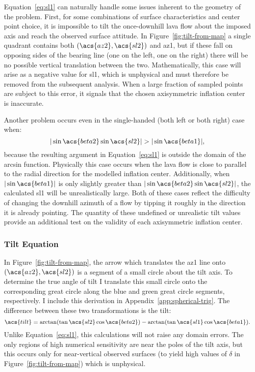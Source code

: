 Equation~\eqref{eq:sl1} can naturally handle some issues inherent to the geometry of the problem. First, for some combinations of surface characteristics and center point choice, it is impossible to tilt the once-downhill lava flow about the imposed axis and reach the observed surface attitude. In Figure~\ref{fig:tilt-from-map} a single quadrant contains both $\left(\acs{az2},\acs{sl2}\right)$ and \acs{az1}, but if these fall on opposing sides of the \acs{bearing} line (one on the left, one on the right) there will be no possible vertical translation between the two. Mathematically, this case will arise as a negative value for \acs{sl1}, which is unphysical and must therefore be removed from the subsequent analysis. When a large fraction of sampled points are subject to this error, it signals that the chosen axisymmetric inflation center is inaccurate.

Another problem occurs even in the single-handed (both left or both right) case when:
\begin{equation}
     |\sin\acs{beta2}\sin\acs{sl2}| > |\sin\acs{beta1}|,\label{eq:domain-error}
\end{equation}
because the resulting argument in Equation~\eqref{eq:sl1} is outside the domain of the arcsin function. Physically this case occurs when the lava flow is close to parallel to the radial direction for the modelled inflation center. Additionally, when $|\sin\acs{beta1}|$ is only slightly greater than $|\sin\acs{beta2}\sin\acs{sl2}|$, the calculated \acs{sl1} will be unrealistically large. Both of these cases reflect the difficulty of changing the downhill azimuth of a flow by tipping it roughly in the direction it is already pointing. The quantity of these undefined or unrealistic tilt values provide an additional test on the validity of each axisymmetric inflation center.

\subsubsection{Tilt Equation}

In Figure~\ref{fig:tilt-from-map}, the arrow which translates the \acs{az1} line onto $\left(\acs{az2},\acs{sl2}\right)$ is a segment of a small circle about the tilt axis. To determine the true angle of tilt I translate this small circle onto the corresponding great circle along the blue and green great circle segments, respectively. I include this derivation in Appendix~\ref{app:spherical-trig}. The difference between these two transformations is the tilt: 
\begin{equation}
    \acs{tilt} = \arctan(\tan\acs{sl2}\cos\acs{beta2}) - \arctan(\tan\acs{sl1}\cos\acs{beta1}).\label{eq:tilt-from-map}
\end{equation}
Unlike Equation~\eqref{eq:sl1}, this calculations will not raise any domain errors. The only regions of high numerical sensitivity are near the poles of the tilt axis, but this occurs only for near-vertical observed surfaces (to yield high values of $\delta$ in Figure~\ref{fig:tilt-from-map}) which is unphysical.

